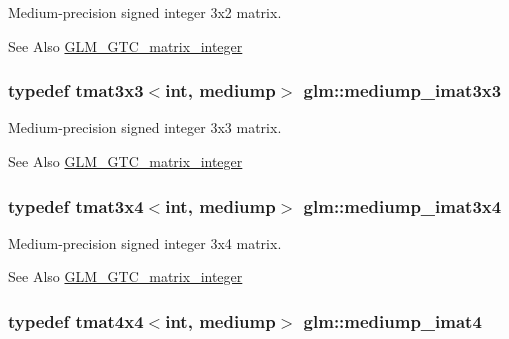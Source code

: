 Medium-\/precision signed integer 3x2 matrix. \begin{DoxySeeAlso}{See Also}
\hyperlink{group__gtc__matrix__integer}{G\-L\-M\-\_\-\-G\-T\-C\-\_\-matrix\-\_\-integer} 
\end{DoxySeeAlso}
\hypertarget{group__gtc__matrix__integer_gab4c647321a342c58119144ad08c6c406}{
\subsubsection[{mediump\-\_\-imat3x3}]{\setlength{\rightskip}{0pt plus 5cm}typedef tmat3x3$<$int, mediump$>$ {\bf glm\-::mediump\-\_\-imat3x3}}}\label{group__gtc__matrix__integer_gab4c647321a342c58119144ad08c6c406}
Medium-\/precision signed integer 3x3 matrix. \begin{DoxySeeAlso}{See Also}
\hyperlink{group__gtc__matrix__integer}{G\-L\-M\-\_\-\-G\-T\-C\-\_\-matrix\-\_\-integer} 
\end{DoxySeeAlso}
\hypertarget{group__gtc__matrix__integer_ga721a754fc35cc5ac097e331d893a6b2c}{
\subsubsection[{mediump\-\_\-imat3x4}]{\setlength{\rightskip}{0pt plus 5cm}typedef tmat3x4$<$int, mediump$>$ {\bf glm\-::mediump\-\_\-imat3x4}}}\label{group__gtc__matrix__integer_ga721a754fc35cc5ac097e331d893a6b2c}
Medium-\/precision signed integer 3x4 matrix. \begin{DoxySeeAlso}{See Also}
\hyperlink{group__gtc__matrix__integer}{G\-L\-M\-\_\-\-G\-T\-C\-\_\-matrix\-\_\-integer} 
\end{DoxySeeAlso}
\hypertarget{group__gtc__matrix__integer_ga680c97868de08658ca4924718d951def}{
\subsubsection[{mediump\-\_\-imat4}]{\setlength{\rightskip}{0pt plus 5cm}typedef tmat4x4$<$int, mediump$>$ {\bf glm\-::mediump\-\_\-imat4}}}\label{group__gtc__matrix__integer_ga680c97868de08658ca4924718d951def}
